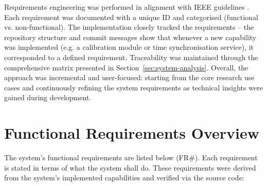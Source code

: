 Requirements engineering was performed in alignment with IEEE guidelines \cite{ref11}. Each requirement was documented with a unique ID and categorised (functional vs. non-functional). The implementation closely tracked the requirements -- the repository structure and commit messages show that whenever a new capability was implemented (e.g. a calibration module or time synchronisation service), it corresponded to a defined requirement. Traceability was maintained through the comprehensive matrix presented in Section~\ref{sec:system-analysis}. Overall, the approach was incremental and user-focused: starting from the core research use cases and continuously refining the system requirements as technical insights were gained during development.


\section{Functional Requirements Overview}
The system's functional requirements are listed below (FR\#). Each requirement is stated in terms of what the system shall do. These requirements were derived from the system's implemented capabilities and verified via the source code:

